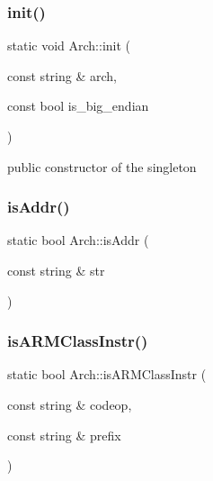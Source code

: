 \mbox{\label{classArch_a6e55f92618422dfae2ecca4a8b760749}} 
\subsubsection{\texorpdfstring{init()}{init()}}
{\footnotesize\ttfamily static void Arch\+::init (\begin{DoxyParamCaption}\item[{const string \&}]{arch,  }\item[{const bool}]{is\+\_\+big\+\_\+endian }\end{DoxyParamCaption})\hspace{0.3cm}{\ttfamily [static]}}

public constructor of the singleton \mbox{\label{classArch_ada2832978d79268be376c443b65b37ed}} 
\subsubsection{\texorpdfstring{is\+Addr()}{isAddr()}}
{\footnotesize\ttfamily static bool Arch\+::is\+Addr (\begin{DoxyParamCaption}\item[{const string \&}]{str }\end{DoxyParamCaption})\hspace{0.3cm}{\ttfamily [static]}}

\mbox{\label{classArch_a268deb415f38b6b4dec40ebb7ed5d00c}} 
\subsubsection{\texorpdfstring{is\+A\+R\+M\+Class\+Instr()}{isARMClassInstr()}}
{\footnotesize\ttfamily static bool Arch\+::is\+A\+R\+M\+Class\+Instr (\begin{DoxyParamCaption}\item[{const string \&}]{codeop,  }\item[{const string \&}]{prefix }\end{DoxyParamCaption})\hspace{0.3cm}{\ttfamily [static]}}

